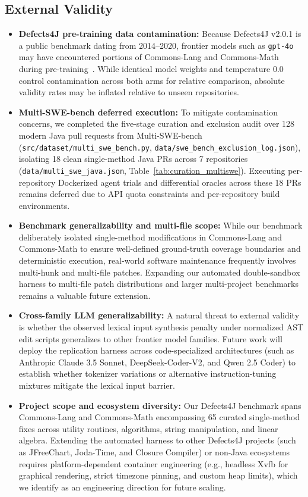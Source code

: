 \documentclass[12pt, a4paper]{article}
\begin{document}
\subsection{External Validity}
\begin{itemize}[leftmargin=*]
  \item \textbf{Defects4J pre-training data contamination:} Because Defects4J v2.0.1 is a public benchmark dating from 2014--2020, frontier models such as \texttt{gpt-4o} may have encountered portions of Commons-Lang and Commons-Math during pre-training~\citep{lee2023ghrb,kang2023libro}. While identical model weights and temperature $0.0$ control contamination across both arms for relative comparison, absolute validity rates may be inflated relative to unseen repositories.
  \item \textbf{Multi-SWE-bench deferred execution:} To mitigate contamination concerns, we completed the five-stage curation and exclusion audit over 128 modern Java pull requests from Multi-SWE-bench~\citep{multiswebench2025} (\texttt{src/dataset/multi\_swe\_bench.py}, \texttt{data/swe\_bench\_exclusion\_log.json}), isolating 18 clean single-method Java PRs across 7 repositories (\texttt{data/multi\_swe\_java.json}, Table~\ref{tab:curation_multiswe}). Executing per-repository Dockerized agent trials and differential oracles across these 18 PRs remains deferred due to API quota constraints and per-repository build environments.
  \item \textbf{Benchmark generalizability and multi-file scope:} While our benchmark deliberately isolated single-method modifications in Commons-Lang and Commons-Math to ensure well-defined ground-truth coverage boundaries and deterministic execution, real-world software maintenance frequently involves multi-hunk and multi-file patches.
    Expanding our automated double-sandbox harness to multi-file patch distributions and larger multi-project benchmarks remains a valuable future extension.
  \item \textbf{Cross-family LLM generalizability:} A natural threat to external validity is whether the observed lexical input synthesis penalty under normalized AST edit scripts generalizes to other frontier model families. Future work will deploy the replication harness across code-specialized architectures (such as Anthropic Claude 3.5 Sonnet, DeepSeek-Coder-V2, and Qwen 2.5 Coder) to establish whether tokenizer variations or alternative instruction-tuning mixtures mitigate the lexical input barrier.
  \item \textbf{Project scope and ecosystem diversity:} Our Defects4J benchmark spans Commons-Lang and Commons-Math encompassing 65 curated single-method fixes across utility routines, algorithms, string manipulation, and linear algebra. Extending the automated harness to other Defects4J projects (such as JFreeChart, Joda-Time, and Closure Compiler) or non-Java ecosystems requires platform-dependent container engineering (e.g., headless Xvfb for graphical rendering, strict timezone pinning, and custom heap limits), which we identify as an engineering direction for future scaling.
\end{itemize}
\end{document}
